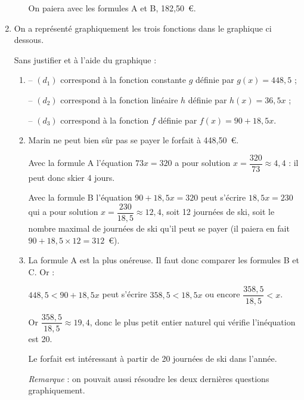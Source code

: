 \begin{enumerate}
\begin{enumerate}
On paiera avec les formules A et B, 182,50~\euro.
	\end{enumerate}

	\item On a représenté graphiquement les trois fonctions dans le graphique ci dessous.
	
	Sans justifier et à l'aide du graphique :
	
	\begin{enumerate}
		\item %
-- $\left(d_1\right)$ correspond à la fonction constante $g$ définie par $g(x) = 448,5$ ;

-- $\left(d_2\right)$ correspond à la fonction linéaire $h$ définie par $h(x) = 36,5x$ ;

-- $\left(d_3\right)$ correspond à la fonction  $f$ définie par $f(x) = 90 + 18,5x$.
		
		\item %
Marin ne peut bien sûr pas se payer le forfait à 448,50~\euro.

Avec la formule A l'équation $73x = 320$ a pour solution $x = \dfrac{320}{73} \approx 4,4$ : il peut donc skier 4 jours.

Avec la formule B l'équation $90 + 18,5x = 320$ peut s'écrire $18,5x = 230$ qui a pour solution $x  = \dfrac{230}{18,5} \approx 12,4$, soit 12 journées de ski, soit le nombre maximal de journées de ski qu'il peut se payer (il paiera en fait $90 + 18,5 \times 12 = 312$~\euro).
		
		\item %
La formule A est la plus onéreuse. Il faut donc comparer les formules B et C. Or :
		
$448,5 < 90 + 18,5x$ peut s'écrire $358,5 < 18,5x$ ou encore $\dfrac{358,5}{18,5} < x$.
		
Or $\dfrac{358,5}{18,5} \approx 19,4$, donc le plus petit entier naturel qui vérifie l'inéquation est 20.
		
Le forfait est intéressant à partir de 20 journées de ski dans l'année.

\emph{Remarque} : on pouvait aussi résoudre les deux dernières questions graphiquement.
	\end{enumerate}
\end{enumerate}

